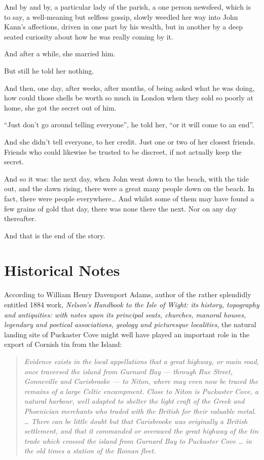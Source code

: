 \documentclass[
  12pt,
  a5paper,
  twoside]{book}
\begin{document}
And by and by, a particular lady of the parish, a one person newsfeed,
which is to say, a well-meaning but selfless gossip, slowly weedled her
way into John Kann's affections, driven in one part by his wealth, but
in another by a deep seated curiosity about how he was really coming by
it.

And after a while, she married him.

But still he told her nothing.

And then, one day, after weeks, after months, of being asked what he was
doing, how could those shells be worth so much in London when they sold
so poorly at home, she got the secret out of him.

``Just don't go around telling everyone'', he told her, ``or it will
come to an end''.

And she didn't tell everyone, to her credit. Just one or two of her
closest friends. Friends who could likewise be trusted to be discreet,
if not actually keep the secret.

And so it was: the next day, when John went down to the beach, with the
tide out, and the dawn rising, there were a great many people down on
the beach. In fact, there were people everywhere\ldots{} And whilst some
of them may have found a few grains of gold that day, there was none
there the next. Nor on any day thereafter.

And that is the end of the story.


\chapter{Historical Notes}\label{historical-notes}

According to William Henry Davenport Adams, author of the rather
splendidly entitled 1884 work, \emph{Nelson's Handbook to the Isle of
Wight: its history, topography and antiquities: with notes upon its
principal seats, churches, manoral houses, legendary and poetical
associations, geology and picturesque localities}, the natural landing
site of Puckaster Cove might well have played an important role in the
export of Cornish tin from the Island:

\begin{quote}
\emph{Evidence exists in the local appellations that a great highway, or
main road, once traversed the island from Gurnard Bay --- through Rue
Street, Gonneville and Carisbrooke --- to Niton, where may even now be
traced the remains of a large Celtic encampment. Close to Niton is
Puckaster Cove, a natural harbour, well adapted to shelter the light
craft of the Greek and Phoenician merchants who traded with the British
for their valuable metal.} \ldots{} \emph{There can be little doubt but
that Carisbrooke was originally a British settlement, and that it
commanded or overawed the great highway of the tin trade which crossed
the island from Gurnard Bay to Puckaster Cove \ldots{} in the old times
a station of the Roman fleet.}
\end{quote}
\end{document}
